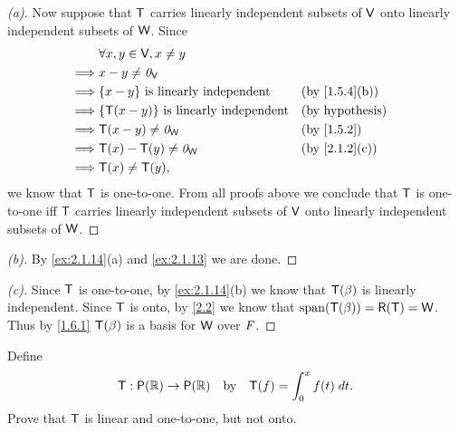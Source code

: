 \begin{proof}[(a)]
  Now suppose that \(\mathsf{T}\) carries linearly independent subsets of \(\mathsf{V}\) onto linearly independent subsets of \(\mathsf{W}\).
  Since
  \begin{align*}
             & \forall x, y \in \V, x \neq y                                                    \\
    \implies & x - y \neq \zv_{\V}                                                              \\
    \implies & \set{x - y} \text{ is linearly independent}     &  & \text{(by \cref{1.5.4}(b))} \\
    \implies & \set{\T(x - y)} \text{ is linearly independent} &  & \text{(by hypothesis)}      \\
    \implies & \T(x - y) \neq \zv_{\W}                         &  & \text{(by \cref{1.5.2})}    \\
    \implies & \T(x) - \T(y) \neq \zv_{\W}                     &  & \text{(by \cref{2.1.2}(c))} \\
    \implies & \T(x) \neq \T(y),
  \end{align*}
  we know that \(\mathsf{T}\) is one-to-one.
  From all proofs above we conclude that \(\mathsf{T}\) is one-to-one iff \(\mathsf{T}\) carries linearly independent subsets of \(\mathsf{V}\) onto linearly independent subsets of \(\mathsf{W}\).
\end{proof}

\begin{proof}[(b)]
  By \cref{ex:2.1.14}(a) and \cref{ex:2.1.13} we are done.
\end{proof}

\begin{proof}[(c)]
  Since \(\mathsf{T}\) is one-to-one, by \cref{ex:2.1.14}(b) we know that \(\mathsf{T}(\beta)\) is linearly independent.
  Since \(\mathsf{T}\) is onto, by \cref{2.2} we know that \(\spn{\T(\beta)} = \rg{\T} = \W\).
  Thus by \cref{1.6.1} \(\mathsf{T}(\beta)\) is a basis for \(\mathsf{W}\) over \(\mathit{F}\).
\end{proof}

\begin{ex}\label{ex:2.1.15}
  Define
  \[
    \T : \ps{\R} \to \ps{\R} \quad \text{by} \quad \T(f) = \int_0^x f(t) \; dt.
  \]
  Prove that \(\mathsf{T}\) is linear and one-to-one, but not onto.
\end{ex}

